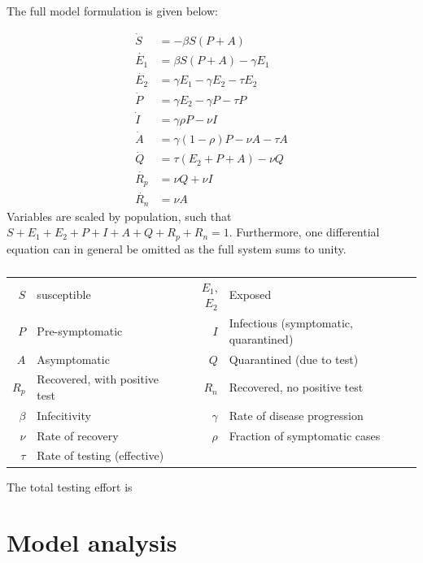 \documentclass[10pt,a4paper]{article}
\begin{document}
The full model formulation is given below:

\begin{align}
    \dot{S} &= - \beta S (P+A) \\ \label{eq:modeldefinition}
    \dot{E_1} &= \beta S (P+A) - \gamma E_1 \\
    \dot{E_2} &= \gamma E_1 - \gamma E_2 - \tau E_2\\
    \dot{P} &= \gamma E_2 - \gamma P - \tau P\\
    \dot{I} &= \gamma \rho P - \nu I \\
    \dot{A} &= \gamma (1-\rho) P - \nu A -\tau A \\
    \dot{Q} &= \tau (E_2 + P + A) - \nu Q \\
    \dot{R_p} &= \nu Q + \nu I \\
    \dot{R_n} &= \nu A 
\end{align}
Variables are scaled by population, such that $S+E_1+E_2+P+I+A+Q+R_p+R_n = 1$. 
Furthermore, one differential equation can in general be omitted as the full system sums to unity.

\begin{table}[h!] \centering
    \label{tab:modeldesc}\caption{}
\begin{tabular}{|r|l||r|l|}
    \hline 
    $S$ & susceptible & $E_1$, $E_2$ & Exposed \\
    $P$ & Pre-symptomatic & $I$ & Infectious (symptomatic, quarantined) \\
    $A$ & Asymptomatic & $Q$ & Quarantined (due to test) \\
    $R_p$ & Recovered, with positive test & $R_n$ & Recovered, no positive test \\
    \hline \hline 
    $\beta$ & Infecitivity & $\gamma $ & Rate of disease progression \\
    $\nu $ & Rate of recovery & $\rho $ & Fraction of symptomatic cases \\
    $ \tau $ & Rate of testing (effective) && \\
    \hline 
\end{tabular}
\end{table}

The total testing effort is 

\section{Model analysis}
\end{document}
